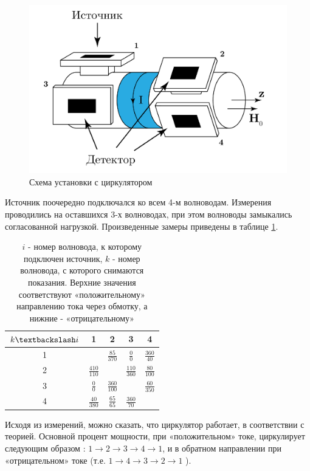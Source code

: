 \begin{figure}[h!]
    \centering
    \includegraphics[width = 0.6\linewidth]{imgs/circulator2.pdf}
    \caption{Схема установки с циркулятором}
    \label{fig:exp:circulator2}
\end{figure}

Источник поочередно подключался ко всем 4-м волноводам. Измерения проводились
на оставшихся 3-х волноводах, при этом волноводы замыкались согласованной
нагрузкой. Произведенные замеры приведены в таблице \ref{tab:faradey}.
 \begin{table}[h!]
    \centering
    \bgroup
    \def\arraystretch{1.2}
    \begin{tabular}{|c|c|c|c|c|}
    \hline
     $k \textbackslash i$ & 1 & 2 & 3 & 4 \\ \hline
    1 & \cellcolor{black!70}  & $\frac{85}{370}$ & $\frac{0}{0}$& $\frac{360}{40}$  \\ \hline
    2 & $\frac{410}{110}$  &\cellcolor{black!70}   & $\frac{110}{360}$  & $\frac{80}{100}$  \\ \hline
    3 & $\frac{0}{0}$  & $\frac{360}{100}$  & \cellcolor{black!70}  &  $\frac{60}{350}$ \\ \hline
    4 & $\frac{40}{380}$  & $\frac{65}{65}$  & $\frac{360}{70}$  & \cellcolor{black!70} \\ \hline
    \end{tabular}
    \egroup
    \caption{$i$ - номер волновода, к которому подключен источник, $k$ - номер волновода, с которого снимаются
    показания. Верхние значения соответствуют «положительному» направлению тока через обмотку, а нижние - «отрицательному»}
    \label{tab:faradey}
    \end{table}

Исходя из измерений, можно сказать, что циркулятор работает, в соответствии с теорией. Основной процент мощности, при
«положительном» токе, циркулирует следующим образом : $1 \rightarrow 2 \rightarrow 3 \rightarrow 4 \rightarrow 1$, и
в обратном направлении при «отрицательном» токе (т.е. $1 \rightarrow 4 \rightarrow 3 \rightarrow 2 \rightarrow 1$ ).

